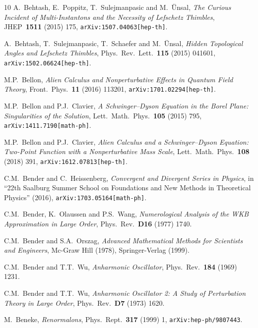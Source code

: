 \documentclass[11pt,a4paper]{article}
\begin{document}
\begin{thebibliography}{10}
A.~Behtash, E.~Poppitz, T.~Sulejmanpasic and M.~\"Unsal,
\textit{The Curious Incident of Multi-Instantons and the Necessity of Lefschetz Thimbles},
JHEP\ \textbf{1511} (2015) 175,
\texttt{arXiv:1507.04063[hep-th]}.

A.~Behtash, T.~Sulejmanpasic, T.~Schaefer and M.~\"Unsal,
\textit{Hidden Topological Angles and Lefschetz Thimbles},
Phys.\ Rev.\ Lett.\ \textbf{115} (2015) 041601,
\texttt{arXiv:1502.06624[hep-th]}.

M.P.~Bellon,
\textit{Alien Calculus and Nonperturbative Effects in Quantum Field Theory},
Front.\ Phys.\ \textbf{11} (2016) 113201,
\texttt{arXiv:1701.02294[hep-th]}.

M.P.~Bellon and P.J.~Clavier,
\textit{A Schwinger--Dyson Equation in the Borel Plane: Singularities of the Solution},
Lett.\ Math.\ Phys.\ \textbf{105} (2015) 795,
\texttt{arXiv:1411.7190[math-ph]}.

M.P.~Bellon and P.J.~Clavier,
\textit{Alien Calculus and a Schwinger--Dyson Equation: Two-Point Function with a Nonperturbative Mass Scale},
Lett.\ Math.\ Phys.\ \textbf{108} (2018) 391,
\texttt{arXiv:1612.07813[hep-th]}.

C.M.~Bender and C.~Heissenberg,
\textit{Convergent and Divergent Series in Physics},
in ``22th Saalburg Summer School on Foundations and New Methods in Theoretical Physics'' (2016),
\texttt{arXiv:1703.05164[math-ph]}.

C.M.~Bender, K.~Olaussen and P.S.~Wang,
\textit{Numerological Analysis of the WKB Approximation in Large Order},
Phys.\ Rev.\ \textbf{D16} (1977) 1740.

C.M.~Bender and S.A.~Orszag,
\textit{Advanced Mathematical Methods for Scientists and Engineers},
Mc-Graw Hill (1978), Springer-Verlag (1999).

C.M.~Bender and T.T.~Wu,
\textit{Anharmonic Oscillator},
Phys.\ Rev.\ \textbf{184} (1969) 1231.

C.M.~Bender and T.T.~Wu,
\textit{Anharmonic Oscillator 2: A Study of Perturbation Theory in Large Order},
Phys.\ Rev.\ \textbf{D7} (1973) 1620.

M.~Beneke,
\textit{Renormalons},
Phys.\ Rept.\ \textbf{317} (1999) 1,
\texttt{arXiv:hep-ph/9807443}.


\end{thebibliography}
\end{document}
